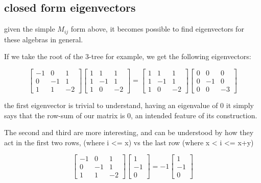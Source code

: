 \documentclass{report}
\begin{document}
\subsection{closed form eigenvectors}

given the simple $M_{ij}$ form above, it becomes possible to find eigenvectors for
these algebras in general.

If we take the root of the 3-tree for example, we get the following
eigenvectors:

\begin{equation*}
\left[\begin{matrix}
	-1 & 0 & 1\\
	0 & -1 & 1\\
	1 & 1 & -2
\end{matrix}\right]
\left[\begin{matrix}
	1 & 1 & 1\\
	1 & -1 & 1\\
	1 & 0 & -2
\end{matrix}\right]
=
\left[\begin{matrix}
	1 & 1 & 1\\
	1 & -1 & 1\\
	1 & 0 & -2
\end{matrix}\right]
\left[\begin{matrix}
	0 & 0 & 0\\
	0 & -1 & 0\\
	0 & 0 & -3
\end{matrix}\right]
\end{equation*}

the first eigenvector is trivial to understand, having an eigenvalue of 0 it
simply says that the row-sum of our matrix is 0, an intended feature of its
construction.

The second and third are more interesting, and can be understood by how they
act in the first two rows, (where i <= x) vs the last row (where x < i <= x+y)

\begin{equation*}
\left[\begin{matrix}
	-1 & 0 & 1\\
	0 & -1 & 1\\
	1 & 1 & -2
\end{matrix}\right]
\left[\begin{matrix}
	1\\
	-1\\
	0
\end{matrix}\right]
=
-1
\left[\begin{matrix}
	1\\
	-1\\
	0
\end{matrix}\right]
\end{equation*}
\end{document}
